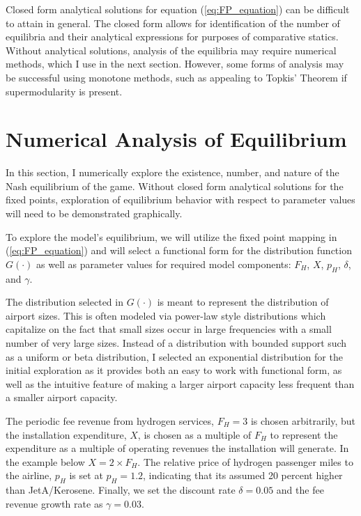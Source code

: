 \documentclass[a4paper, 14pt]{article}
\begin{document}
Closed form analytical solutions for equation (\ref{eq:FP_equation}) can be difficult to attain in general.
The closed form allows for identification of the number of equilibria and their analytical expressions for purposes of comparative statics.
Without analytical solutions, analysis of the equilibria may require numerical methods, which I use in the next section.
However, some forms of analysis may be successful using monotone methods, such as appealing to Topkis' Theorem if supermodularity is present.

\section{Numerical Analysis of Equilibrium}
\label{sec:equilibrium_NA}
In this section, I numerically explore the existence, number, and nature of the Nash equilibrium of the game.
Without closed form analytical solutions for the fixed points, exploration of equilibrium behavior with respect to parameter values will need to be demonstrated graphically.

To explore the model's equilibrium, we will utilize the fixed point mapping in (\ref{eq:FP_equation}) and will select a functional form for the distribution function $G(\cdot)$ as well as parameter values for required model components: $F_H$, $X$, $p_H$, $\delta$, and $\gamma$.

The distribution selected in $G(\cdot)$ is meant to represent the distribution of airport sizes.
This is often modeled via power-law style distributions which capitalize on the fact that small sizes occur in large frequencies with a small number of very large sizes.
Instead of a distribution with bounded support such as a uniform or beta distribution, I selected an exponential distribution for the initial exploration as it provides both an easy to work with functional form, as well as the intuitive feature of making a larger airport capacity less frequent than a smaller airport capacity.

The periodic fee revenue from hydrogen services, $F_H = 3$ is chosen arbitrarily, but the installation expenditure, $X$, is chosen as a multiple of $F_H$ to represent the expenditure as a multiple of operating revenues the installation will generate.
In the example below $X = 2\times F_H$.
The relative price of hydrogen passenger miles to the airline, $p_H$ is set at $p_H = 1.2$, indicating that its assumed 20 percent higher than JetA/Kerosene.
Finally, we set the discount rate $\delta = 0.05$ and the fee revenue growth rate as $\gamma = 0.03$.
\end{document}
